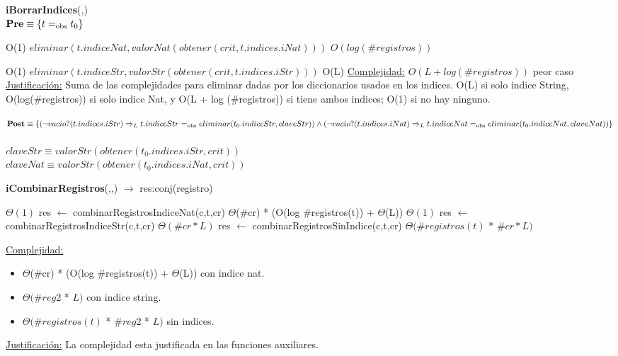 \begin{algorithm}[H]{\textbf{iBorrarIndices}(,)}
	{\\ $\textbf{Pre} \equiv \{t =_{\mathrm{obs}} t_0\}$}
	\begin{algorithmic}[1]

			\Comment O(1)
			\State $eliminar(t.indiceNat,valorNat(obtener(crit,t.indices.iNat)))$ \Comment $O(log (\#registros))$
		\EndIf

			\Comment O(1)
			\State $eliminar(t.indiceStr,valorStr(obtener(crit,t.indices.iStr)))$ \Comment O(L)
		\EndIf
		\medskip
		\Statex \underline{Complejidad:} $O(L + log (\#registros))$ peor caso
		\Statex \underline{Justificación:} Suma de las complejidades para eliminar dadas por los diccionarios usados en los indices. O(L) si solo indice String, O(log(\#registros)) si solo indice Nat, y O(L + log (\#registros)) si tiene ambos indices; O(1) si no hay ninguno.
	\end{algorithmic}
	{$\textbf{Post} \equiv \{(\neg vacio?(t.indices.iStr) \Rightarrow_L t.indiceStr =_{\mathrm{obs}} eliminar(t_0.indiceStr,claveStr)) \land \\
							 (\neg vacio?(t.indices.iNat) \Rightarrow_L t.indiceNat =_{\mathrm{obs}} eliminar(t_0.indiceNat,claveNat)) \}$}
	\\ \\
	{$claveStr \equiv valorStr(obtener(t_0.indices.iStr,crit))$}\\
	{$claveNat \equiv valorStr(obtener(t_0.indices.iNat,crit))$}

\end{algorithm}

\begin{algorithm}[H]{\textbf{iCombinarRegistros}(,,) $\to$ res:conj(registro)}
	\begin{algorithmic}[1]
		 \Comment $\Theta(1)$
			\State res $\gets$ combinarRegistrosIndiceNat(c,t,cr) \Comment $\Theta$($\#$cr) * (O(log $\#$registros(t)) + $\Theta$(L))
		\Else
			 \Comment $\Theta(1)$
				\State res $\gets$ combinarRegistrosIndiceStr(c,t,cr) \Comment $\Theta(\#cr * L)$	
			\Else
				\State res $\gets$ combinarRegistrosSinIndice(c,t,cr)  \Comment $\Theta(\#registros(t)$ * $\#cr * L)$
			\EndIf
		\EndIf

		\medskip
		\Statex \underline{Complejidad:} 
		\begin{itemize}
		\item $\Theta$($\#$cr) * (O(log $\#$registros(t)) + $\Theta$(L)) con indice nat.
		\item $\Theta(\#reg2$ * $L)$	con indice string.
		\item $\Theta(\#registros(t)$ * $\#reg2$ * $L)$	sin indices.
		\end{itemize}
		\Statex \underline{Justificación:} La complejidad esta justificada en las funciones auxiliares.
	\end{algorithmic}
\end{algorithm}

